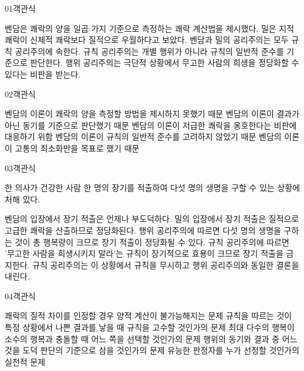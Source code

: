 \documentclass[fs85,seriesWit]{korfarm-base}
\begin{document}
\kfBeginMC
\begin{kfQBlock}{01}{객관식}
\begin{kfChoices}
\kfChoice 벤담은 쾌락의 양을 일곱 가지 기준으로 측정하는 쾌락 계산법을 제시했다.
\kfChoice 밀은 지적 쾌락이 신체적 쾌락보다 질적으로 우월하다고 보았다.
\kfChoice 벤담과 밀의 공리주의는 모두 규칙 공리주의에 속한다.
\kfChoice 규칙 공리주의는 개별 행위가 아니라 규칙의 일반적 준수를 기준으로 판단한다.
\kfChoice 행위 공리주의는 극단적 상황에서 무고한 사람의 희생을 정당화할 수 있다는 비판을 받는다.
\end{kfChoices}
\end{kfQBlock}

\begin{kfQBlock}{02}{객관식}
\begin{kfChoices}
\kfChoice 벤담의 이론이 쾌락의 양을 측정할 방법을 제시하지 못했기 때문
\kfChoice 벤담의 이론이 결과가 아닌 동기를 기준으로 판단했기 때문
\kfChoice 벤담의 이론이 저급한 쾌락을 옹호한다는 비판에 대응하기 위함
\kfChoice 벤담의 이론이 규칙의 일반적 준수를 고려하지 않았기 때문
\kfChoice 벤담의 이론이 고통의 최소화만을 목표로 했기 때문
\end{kfChoices}
\end{kfQBlock}

\begin{kfQBlock}{03}{객관식}
\begin{kfEvidence}한 의사가 건강한 사람 한 명의 장기를 적출하여 다섯 명의 생명을 구할 수 있는 상황에 처해 있다.\end{kfEvidence}
\begin{kfChoices}
\kfChoice 벤담의 입장에서 장기 적출은 언제나 부도덕하다.
\kfChoice 밀의 입장에서 장기 적출은 질적으로 고급한 쾌락을 산출하므로 정당화된다.
\kfChoice 행위 공리주의에 따르면 다섯 명의 생명을 구하는 것이 총 행복량이 크므로 장기 적출이 정당화될 수 있다.
\kfChoice 규칙 공리주의에 따르면 '무고한 사람을 희생시키지 말라'는 규칙이 장기적으로 효용이 크므로 장기 적출을 금지한다.
\kfChoice 규칙 공리주의는 이 상황에서 규칙을 무시하고 행위 공리주의와 동일한 결론을 내린다.
\end{kfChoices}
\end{kfQBlock}

\begin{kfQBlock}{04}{객관식}
\begin{kfChoices}
\kfChoice 쾌락의 질적 차이를 인정할 경우 양적 계산이 불가능해지는 문제
\kfChoice 규칙을 따르는 것이 특정 상황에서 나쁜 결과를 낳을 때 규칙을 고수할 것인가의 문제
\kfChoice 최대 다수의 행복이 소수의 행복과 충돌할 때 어느 쪽을 선택할 것인가의 문제
\kfChoice 행위의 동기와 결과 중 어느 것을 도덕 판단의 기준으로 삼을 것인가의 문제
\kfChoice 유능한 판정자를 누가 선정할 것인가의 실천적 문제
\end{kfChoices}
\end{kfQBlock}
\end{document}
